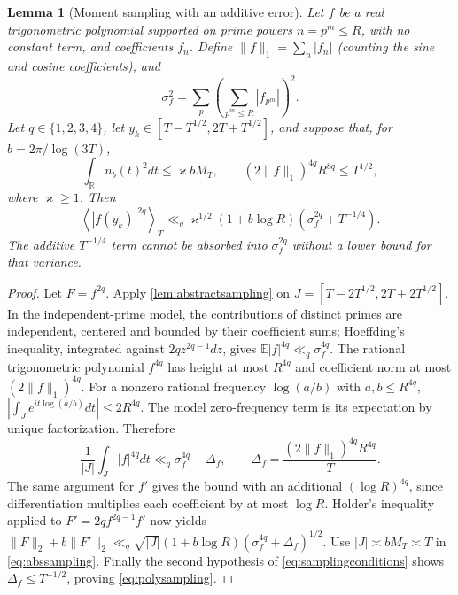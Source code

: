 \documentclass[11pt,reqno]{amsart}
\numberwithin{equation}{section}
\newtheorem{lemma}[theorem]{Lemma}
\newcommand{\av}[1]{\left\langle #1\right\rangle_T}
\begin{document}
\begin{lemma}[Moment sampling with an additive error]\label{lem:polysampling}
Let $f$ be a real trigonometric polynomial supported on prime powers
$n=p^m\le R$, with no constant term, and coefficients $f_n$.
Define
$\|f\|_1=\sum_n|f_n|$ (counting the sine and cosine coefficients),
and
\[
\sigma_f^2=\sum_p\left(\sum_{p^m\le R}|f_{p^m}|\right)^2.
\]
Let $q\in\{1,2,3,4\}$, let $y_k\in[T-T^{1/2},2T+T^{1/2}]$,
and suppose that, for $b=2\pi/\log(3T)$,
\begin{equation}\label{eq:samplingconditions}
\int_{\mathbb R}n_b(t)^2dt\le\varkappa bM_T,
\qquad (2\|f\|_1)^{4q}R^{8q}\le T^{1/2},
\end{equation}
where $\varkappa\ge1$.  Then
\begin{equation}\label{eq:polysampling}
\av{|f(y_k)|^{2q}}
\ll_q\varkappa^{1/2}(1+b\log R)
\left(\sigma_f^{2q}+T^{-1/4}\right).
\end{equation}
The additive $T^{-1/4}$ term cannot be absorbed into
$\sigma_f^{2q}$ without a lower bound for that variance.
\end{lemma}
\begin{proof}
Let $F=f^{2q}$.  Apply \cref{lem:abstractsampling} on
$J=[T-2T^{1/2},2T+2T^{1/2}]$.
In the independent-prime model, the contributions of distinct primes
are independent, centered and bounded by their coefficient sums;
Hoeffding's inequality, integrated against $2qz^{2q-1}dz$,
gives $\mathbb E|f|^{4q}\ll_q\sigma_f^{4q}$.
The rational trigonometric polynomial $f^{4q}$ has height at most
$R^{4q}$ and coefficient norm at most $(2\|f\|_1)^{4q}$.
For a nonzero rational frequency $\log(a/b)$ with $a,b\le R^{4q}$,
$|\int_Je^{it\log(a/b)}dt|\le2R^{4q}$.
The model zero-frequency term is its expectation by unique
factorization.  Therefore
\[
\frac1{|J|}\int_J|f|^{4q}dt
\ll_q\sigma_f^{4q}+\Delta_f,
\qquad \Delta_f=\frac{(2\|f\|_1)^{4q}R^{4q}}T.
\]
The same argument for $f'$ gives the bound with an additional
$(\log R)^{4q}$, since differentiation multiplies each coefficient
by at most $\log R$.  Holder's inequality applied to
$F'=2q f^{2q-1}f'$ now yields
$\|F\|_2+b\|F'\|_2
\ll_q\sqrt{|J|}(1+b\log R)(\sigma_f^{4q}+\Delta_f)^{1/2}$.
Use $|J|\asymp bM_T\asymp T$ in \eqref{eq:abssampling}.
Finally the second hypothesis of \eqref{eq:samplingconditions}
shows $\Delta_f\le T^{-1/2}$, proving \eqref{eq:polysampling}.
\end{proof}
\end{document}
